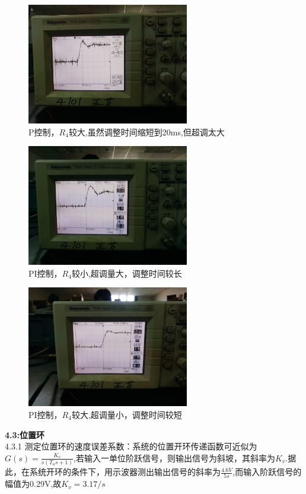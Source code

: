 \documentclass[10.5pt]{ctexart}
\begin{document}
\begin{figure}[!ht]
\centering
\caption{P控制，$R_4$较大,虽然调整时间缩短到20ms,但超调太大}
\includegraphics[width=200pt]{IMG_20161216_101251.jpg}
\end{figure}

\begin{figure}[!ht]
\centering
\caption{PI控制，$R_4$较小,超调量大，调整时间较长}
\includegraphics[width=200pt]{IMG_20161216_103304.jpg}
\end{figure}

\begin{figure}[!ht]
\centering
\caption{PI控制，$R_4$较大,超调量小，调整时间较短}
\includegraphics[width=200pt]{IMG_20161216_103650.jpg}
\end{figure}

\newpage
\textbf{4.3:位置环}\\
4.3.1 测定位置环的速度误差系数：系统的位置开环传递函数可近似为$G(s)=\frac{K_v}{s(T_a s+1)}$,若输入一单位阶跃信号，则输出信号为斜坡，其斜率为$K_v$.据此，在系统开环的条件下，用示波器测出输出信号的斜率为$\frac{4.6V}{5s}$,而输入阶跃信号的幅值为0.29V,故$K_v=3.17/s$
\end{document}

